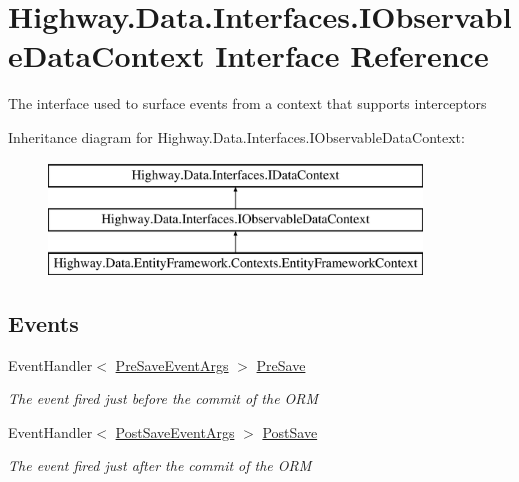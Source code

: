 \hypertarget{interface_highway_1_1_data_1_1_interfaces_1_1_i_observable_data_context}{\section{Highway.\-Data.\-Interfaces.\-I\-Observable\-Data\-Context Interface Reference}
\label{interface_highway_1_1_data_1_1_interfaces_1_1_i_observable_data_context}
}


The interface used to surface events from a context that supports interceptors  


Inheritance diagram for Highway.\-Data.\-Interfaces.\-I\-Observable\-Data\-Context\-:\begin{figure}[H]
\begin{center}
\leavevmode
\includegraphics[height=3.000000cm]{interface_highway_1_1_data_1_1_interfaces_1_1_i_observable_data_context}
\end{center}
\end{figure}
\subsection*{Events}
\begin{DoxyCompactItemize}
\item 
Event\-Handler$<$ \hyperlink{class_highway_1_1_data_1_1_interceptors_1_1_events_1_1_pre_save_event_args}{Pre\-Save\-Event\-Args} $>$ \hyperlink{interface_highway_1_1_data_1_1_interfaces_1_1_i_observable_data_context_add85ecbc05ebf7174003841bdbd72dfe}{Pre\-Save}
\begin{DoxyCompactList}\small\item\em The event fired just before the commit of the O\-R\-M \end{DoxyCompactList}\item 
Event\-Handler$<$ \hyperlink{class_highway_1_1_data_1_1_interceptors_1_1_events_1_1_post_save_event_args}{Post\-Save\-Event\-Args} $>$ \hyperlink{interface_highway_1_1_data_1_1_interfaces_1_1_i_observable_data_context_a1978b914f7b94a37a6e86f3314326ca9}{Post\-Save}
\begin{DoxyCompactList}\small\item\em The event fired just after the commit of the O\-R\-M \end{DoxyCompactList}\end{DoxyCompactItemize}
